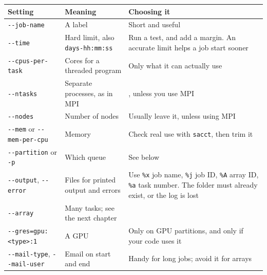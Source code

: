 {\def\LTcaptype{none} %
\begin{longtable}[]{@{}
  >{\raggedright\arraybackslash}p{}
  >{\raggedright\arraybackslash}p{}
  >{\raggedright\arraybackslash}p{}@{}}
\toprule\noalign{}
\begin{minipage}[b]{\linewidth}\raggedright
Setting
\end{minipage} & \begin{minipage}[b]{\linewidth}\raggedright
Meaning
\end{minipage} & \begin{minipage}[b]{\linewidth}\raggedright
Choosing it
\end{minipage} \\
\midrule\noalign{}
\endhead
\bottomrule\noalign{}
\endlastfoot
\texttt{-\/-job-name} & A label & Short and useful \\
\texttt{-\/-time} & Hard limit, also \texttt{days-hh:mm:ss} & Run a test, and add a margin. An accurate limit helps a job start sooner \\
\texttt{-\/-cpus-per-task} & Cores for a threaded program & Only what it can actually use \\
\texttt{-\/-ntasks} & Separate processes, as in MPI & 1, unless you use MPI \\
\texttt{-\/-nodes} & Number of nodes & Usually leave it, unless using MPI \\
\texttt{-\/-mem} or \texttt{-\/-mem-per-cpu} & Memory & Check real use with \texttt{sacct}, then trim it \\
\texttt{-\/-partition} or \texttt{-p} & Which queue & See below \\
\texttt{-\/-output}, \texttt{-\/-error} & Files for printed output and errors & Use \texttt{\%x} job name, \texttt{\%j} job ID, \texttt{\%A} array ID, \texttt{\%a} task number. The folder must already exist, or the log is lost \\
\texttt{-\/-array} & Many tasks; see the next chapter & \\
\texttt{-\/-gres=gpu:\textless{}type\textgreater{}:1} & A GPU & Only on GPU partitions, and only if your code uses it \\
\texttt{-\/-mail-type}, \texttt{-\/-mail-user} & Email on start and end & Handy for long jobs; avoid it for arrays \\
\end{longtable}
}

